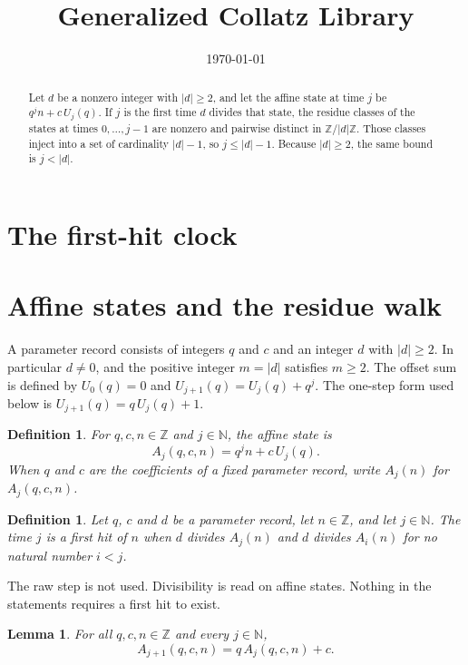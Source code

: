 \documentclass[11pt,letterpaper]{article}
\title{Generalized Collatz Library}
\author{}
\date{\today}
\newcommand{\N}{\mathbb{N}}
\newcommand{\Z}{\mathbb{Z}}
\newtheorem{lemma}[theorem]{Lemma}
\newtheorem{definition}[theorem]{Definition}
\begin{document}
\maketitle
\section*{The first-hit clock}

\begin{abstract}
Let \(d\) be a nonzero integer with \(|d|\ge 2\), and let the affine state at time \(j\) be \(q^{j}n+c\,U_{j}(q)\). If \(j\) is the first time \(d\) divides that state, the residue classes of the states at times \(0,\ldots,j-1\) are nonzero and pairwise distinct in \(\Z/|d|\Z\). Those classes inject into a set of cardinality \(|d|-1\), so \(j\le |d|-1\). Because \(|d|\ge 2\), the same bound is \(j<|d|\).
\end{abstract}

\section{Affine states and the residue walk}

A parameter record consists of integers \(q\) and \(c\) and an integer \(d\) with \(|d|\ge 2\). In particular \(d\neq 0\), and the positive integer \(m=|d|\) satisfies \(m\ge 2\). The offset sum is defined by \(U_{0}(q)=0\) and \(U_{j+1}(q)=U_{j}(q)+q^{j}\). The one-step form used below is \(U_{j+1}(q)=q\,U_{j}(q)+1\).

\begin{definition}
\label{Def:AffineState}
For \(q,c,n\in\Z\) and \(j\in\N\), the affine state is
\[
A_{j}(q,c,n)=q^{j}n+c\,U_{j}(q).
\]
When \(q\) and \(c\) are the coefficients of a fixed parameter record, write \(A_{j}(n)\) for \(A_{j}(q,c,n)\).
\end{definition}

\begin{definition}
\label{Def:FirstHit}
Let \(q\), \(c\) and \(d\) be a parameter record, let \(n\in\Z\), and let \(j\in\N\). The time \(j\) is a first hit of \(n\) when \(d\) divides \(A_{j}(n)\) and \(d\) divides \(A_{i}(n)\) for no natural number \(i<j\).
\end{definition}

The raw step is not used. Divisibility is read on affine states. Nothing in the statements requires a first hit to exist.

\begin{lemma}
\label{Lem:Step}
For all \(q,c,n\in\Z\) and every \(j\in\N\),
\[
A_{j+1}(q,c,n)=q\,A_{j}(q,c,n)+c.
\]
\end{lemma}
\end{document}
